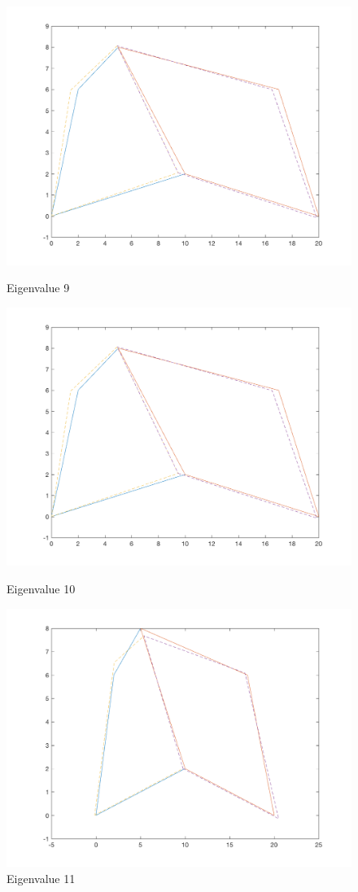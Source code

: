 \documentclass[11pt]{amsart}
\begin{document}
\begin{figure}[H] 
  \label{fig6} 
  \begin{minipage}[b]{0.5\linewidth}
    \centering
    \includegraphics[width=.5\linewidth]{eigenvectors/eigenvector_9_redint.png} 
    \caption{Eigenvalue 9} 
    \vspace{4ex}
  \end{minipage}%
  \begin{minipage}[b]{0.5\linewidth}
    \centering
    \includegraphics[width=.5\linewidth]{eigenvectors/eigenvector_10_redint.png} 
    \caption{Eigenvalue 10} 
    \vspace{4ex}
  \end{minipage} 
  \begin{minipage}[b]{0.5\linewidth}
    \centering
    \includegraphics[width=.5\linewidth]{eigenvectors/eigenvector_11_redint.png} 
    \caption{Eigenvalue 11} 
    \vspace{4ex}
  \end{minipage}%
  \begin{minipage}[b]{0.5\linewidth}

\end{minipage}
\end{figure}
\end{document}

